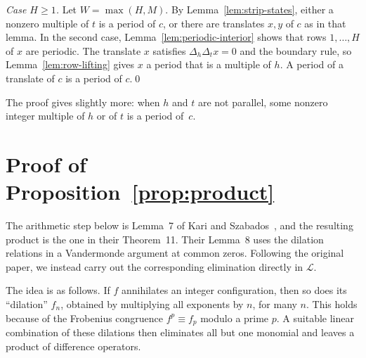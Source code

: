 \documentclass[11pt,a4paper,reqno]{amsart}
\theoremstyle{definition}
\theoremstyle{remark}
\newcommand{\LL}{\mathcal L}
\newcommand{\De}{\Delta}
\numberwithin{equation}{section}
\begin{document}
\emph{Case $H\ge1$.} Let $W=\max(H,M)$. By Lemma~\ref{lem:strip-states}, either a nonzero multiple of $t$ is a period of $c$, or there are translates $x,y$ of $c$ as in that lemma. In the second case, Lemma~\ref{lem:periodic-interior} shows that rows $1,\ldots,H$ of $x$ are periodic. The translate $x$ satisfies $\De_h\De_tx=0$ and the boundary rule, so Lemma~\ref{lem:row-lifting} gives $x$ a period that is a multiple of $h$. A period of a translate of $c$ is a period of $c$.\qed

\medskip
The proof gives slightly more: when $h$ and $t$ are not parallel, some nonzero integer multiple of $h$ or of $t$ is a period of~$c$.

\appendix

\section{Proof of Proposition~\ref{prop:product}}\label{app:product}

The arithmetic step below is Lemma~7 of Kari and Szabados~\cite{KS}, and the resulting product is the one in their Theorem~11. Their Lemma~8 uses the dilation relations in a Vandermonde argument at common zeros. Following the original paper, we instead carry out the corresponding elimination directly in $\LL$.

The idea is as follows. If $f$ annihilates an integer configuration, then so does its ``dilation'' $f_n$, obtained by multiplying all exponents by $n$, for many $n$. This holds because of the Frobenius congruence $f^p\equiv f_p$ modulo a prime $p$. A suitable linear combination of these dilations then eliminates all but one monomial and leaves a product of difference operators.
\end{document}
